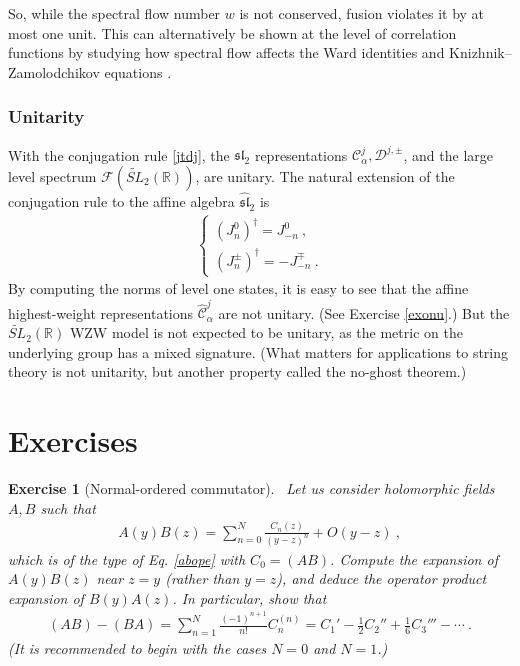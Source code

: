 \documentclass[12pt, a4paper, notitlepage, twoside]{report}
\numberwithin{equation}{section}
\theoremstyle{break}
\newtheorem{exo}{Exercise}[chapter]
\begin{document}
So, while the spectral flow number $w$ is not conserved, fusion violates it by at most one unit.
This can alternatively be shown at the level of correlation functions by studying how spectral flow affects the Ward identities and Knizhnik--Zamolodchikov equations \cite{rib05}.

\subsubsection{Unitarity}

With the conjugation rule \eqref{jtdj}, the $\mathfrak{sl}_2$ representations $\mathcal{C}^j_\alpha,\mathcal{D}^{j,\pm}$, and the large level spectrum $\mathcal{F}(\widetilde{SL}_2(\mathbb{R}))$, are unitary.
The natural extension of the conjugation rule to the affine algebra $\widehat{\mathfrak{sl}}_2$ is
\begin{align}
 \left\{\begin{array}{l} (J_n^0)^\dagger = J_{-n}^0\ , \\
         (J_n^\pm)^\dagger = -J_{-n}^\mp \ .
        \end{array}
\right.
\end{align}
By computing the norms of level one states, it is easy to see that the affine highest-weight representations $\hat{\mathcal{C}}^j_\alpha$  are not unitary. (See Exercise \ref{exonu}.)
But the $\widetilde{SL}_2(\mathbb{R})$ WZW model is not expected to be unitary, as the metric on the underlying group has a mixed signature. (What matters for applications to string theory is not unitarity, but another property called the no-ghost theorem.) 

\section{Exercises}

\begin{exo}[Normal-ordered commutator]
~\label{exoabba}
Let us consider holomorphic fields $A,B$ such that 
\begin{align}
 A(y)B(z) = \sum_{n=0}^N \frac{C_n(z)}{(y-z)^n} + O(y-z)\ ,
\end{align}
which is of the type of Eq. \eqref{abope} with $C_0 = (AB)$. 
Compute the expansion of $A(y)B(z)$ near $z=y$ (rather than $y=z$), and deduce the operator product expansion of $B(y)A(z)$. 
In particular, show that 
\begin{align}
 (AB)-(BA) = \sum_{n=1}^N \frac{(-1)^{n+1}}{n!} C_n^{(n)} = C_1'-\frac12 C_2'' + \frac16 C_3''' -\cdots \ .
\end{align}
(It is recommended to begin with the cases $N=0$ and $N=1$.)
\end{exo}
\end{document}

